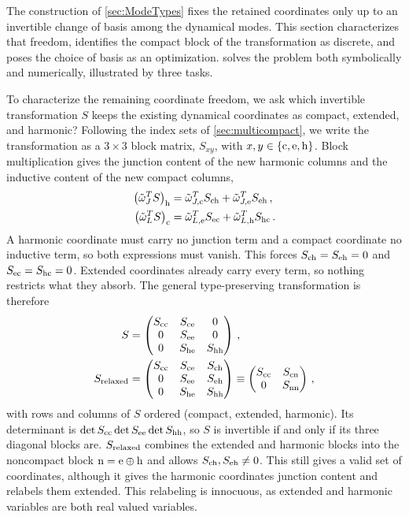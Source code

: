 The construction of \cref{sec:ModeTypes} fixes the retained coordinates only up to an invertible change of basis among the dynamical modes.
This section characterizes that freedom, identifies the compact block of the transformation as discrete, and poses the choice of basis as an optimization.
 solves the problem both symbolically and numerically, illustrated by three tasks.

To characterize the remaining coordinate freedom, we ask which invertible transformation $S$ keeps the existing dynamical coordinates as compact, extended, and harmonic?
Following the index sets of \cref{sec:multicompact}, we write the transformation as a $3\times3$ block matrix, $S_{xy}$, with $x,y\in\{{\rm c},{\rm e},{\rm h}\}$.
Block multiplication gives the junction content of the new harmonic columns and the inductive content of the new compact columns,
\begin{align*}
    \bigl(\tilde\omega_J^TS\bigr)_{\rm h}&=\tilde\omega_{J,\rm c}^TS_{\rm ch}+\tilde\omega_{J,\rm e}^TS_{\rm eh} \, , \\
    \bigl(\tilde\omega_L^TS\bigr)_{\rm c}&=\tilde\omega_{L,\rm e}^TS_{\rm ec}+\tilde\omega_{L,\rm h}^TS_{\rm hc} \, .
\end{align*}
A harmonic coordinate must carry no junction term and a compact coordinate no inductive term, so both expressions must vanish.
This forces $S_{\rm ch}=S_{\rm eh}=0$ and $S_{\rm ec}=S_{\rm hc}=0$.
Extended coordinates already carry every term, so nothing restricts what they absorb.
The general type-preserving transformation is therefore
\begin{equation}
\begin{aligned}
    S&=\begin{pmatrix}S_{\rm cc}&S_{\rm ce}&0\\0&S_{\rm ee}&0\\0&S_{\rm he}&S_{\rm hh}\end{pmatrix}\,, \\
    S_{\rm relaxed}&=\begin{pmatrix}S_{\rm cc}&S_{\rm ce}&S_{\rm ch}\\0&S_{\rm ee}&S_{\rm eh}\\0&S_{\rm he}&S_{\rm hh}\end{pmatrix}\equiv\begin{pmatrix}S_{\rm cc}&S_{\rm cn}\\0&S_{\rm nn}\end{pmatrix} \, ,
\end{aligned}
\label{eq:S_structure}
\end{equation}
with rows and columns of $S$ ordered (compact, extended, harmonic).
Its determinant is $\det S_{\rm cc}\det S_{\rm ee}\det S_{\rm hh}$, so $S$ is invertible if and only if its three diagonal blocks are.
$S_{\rm relaxed}$ combines the extended and harmonic blocks into the noncompact block ${\rm n}={\rm e}\oplus{\rm h}$ and allows $S_{\rm ch},S_{\rm eh}\neq0$.
This still gives a valid set of coordinates, although it gives the harmonic coordinates junction content and relabels them extended.
This relabeling is innocuous, as extended and harmonic variables are both real valued variables.


